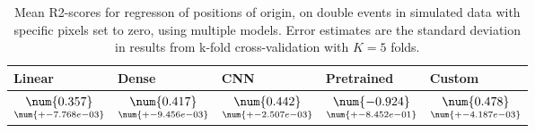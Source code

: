 \begin{table}
\centering
\caption{
Mean R2-scores for regresson of positions of origin, on double events in simulated data with specific pixels
set to zero, using multiple models. 
Error estimates are the standard deviation in results from k-fold cross-validation 
with $K=5$ folds.
}
\label{tab:regression-simulated-double-position-pixelmod-r2}
\begin{tabular}{lllll}
\toprule
                                             Linear &                                               Dense &                                                 CNN &                                           Pretrained &                                              Custom \\
\midrule
 $\underset{\num{+- 7.768e-03 }  }{\num{ 0.357 } }$ &  $\underset{\num{+- 9.456e-03 }  }{\num{ 0.417 } }$ &  $\underset{\num{+- 2.507e-03 }  }{\num{ 0.442 } }$ &  $\underset{\num{+- 8.452e-01 }  }{\num{ -0.924 } }$ &  $\underset{\num{+- 4.187e-03 }  }{\num{ 0.478 } }$ \\
\bottomrule
\end{tabular}
\end{table}

